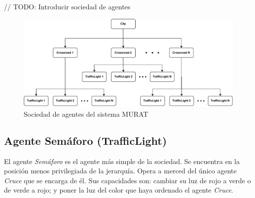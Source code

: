 // TODO: Introducir sociedad de agentes

\begin{figure}[H]
    \centering
    \includegraphics[width=1\linewidth]{text/image/DAgen-Sociedad_de_agentes.pdf}
    \caption{Sociedad de agentes del sistema MURAT}
    \label{fig:sociedad_de_agentes}
\end{figure}

\subsection{Agente Semáforo (TrafficLight)}
El agente \textit{Semáforo} es el agente más simple de la sociedad. Se encuentra en la posición menos privilegiada de la jerarquía. Opera a merced del único agente \textit{Cruce} que se encarga de él. Sus capacidades son: cambiar su luz de rojo a verde o de verde a rojo; y poner la luz del color que haya ordenado el agente \textit{Cruce}. 

